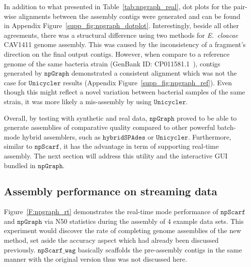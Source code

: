 \documentclass[10pt,twocolumn,twoside]{genpaper}
\newcommand{\npscarf}{$\mathtt{npScarf}$}
\newcommand{\npscarfg}{$\mathtt{npScarf\_wag}$}
\newcommand{\npgraph}{$\mathtt{npGraph}$}
\newcommand{\unicycler}{$\mathtt{Unicycler}$}
\begin{document}
In addition to what presented in Table~\ref{tab:npgraph_real}, dot plots for the pair-wise alignments between the assembly contigs were generated and can be found in Appendix Figure~\ref{supp_fig:npgraph_dotplot}. Interestingly, beside all other agreements, there was a structural difference using two methods for \emph{E.~cloacae} CAV1411 genome assembly. This was caused by the inconsistency of a fragment's direction on the final output contigs. However, when compare to a reference genome of the same bacteria strain (GenBank ID: CP011581.1~\cite{Potter2016rapid}), contigs generated by \npgraph{} demonstrated a consistent alignment which was not the case for \unicycler{} results (Appendix Figure~\ref{supp_fig:npgraph_ref}). Even though this might reflect a novel variation between bacterial samples of the same strain, it was more likely a mis-assembly by using \unicycler{}.

Overall, by testing with synthetic and real data, \npgraph{} proved to be able to generate assemblies of comparative quality compared to other powerful batch-mode hybrid assemblers, such as $\mathtt{hybridSPAdes}$ or \unicycler{}.
Furthermore, similar to \npscarf{}, it has the advantage in term of supporting real-time assembly. The next section will address this utility and the interactive GUI bundled in \npgraph{}. 

\subsection*{Assembly performance on streaming data}
Figure~\ref{F:npgraph_rt} demonstrates the real-time mode performance of \npscarf{} and \npgraph{} via N50 statistics during the assembly of 4 example data sets.
This experiment would discover the rate of completing genome assemblies of the new method, set aside the accuracy aspect which had already been discussed previously.
\npscarfg{} basically scaffolds the pre-assembly contigs in the same manner with the original version thus was not discussed here.
\end{document}
